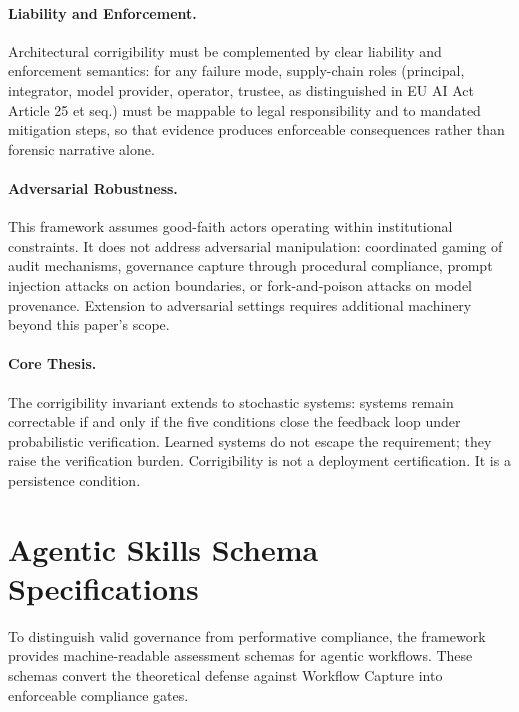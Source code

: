 \documentclass[11pt,a4paper]{article}
\theoremstyle{definition}
\begin{document}
\paragraph{Liability and Enforcement.} Architectural corrigibility must be complemented by clear liability and enforcement semantics: for any failure mode, supply-chain roles (principal, integrator, model provider, operator, trustee, as distinguished in EU AI Act Article 25 et seq.) must be mappable to legal responsibility and to mandated mitigation steps, so that evidence produces enforceable consequences rather than forensic narrative alone.

\paragraph{Adversarial Robustness.} This framework assumes good-faith actors operating within institutional constraints. It does not address adversarial manipulation: coordinated gaming of audit mechanisms, governance capture through procedural compliance, prompt injection attacks on action boundaries, or fork-and-poison attacks on model provenance. Extension to adversarial settings requires additional machinery beyond this paper's scope.

\paragraph{Core Thesis.} The corrigibility invariant extends to stochastic systems: systems remain correctable if and only if the five conditions close the feedback loop under probabilistic verification. Learned systems do not escape the requirement; they raise the verification burden. Corrigibility is not a deployment certification. It is a persistence condition.


\appendix

\section{Agentic Skills Schema Specifications}
\label{appendix:agentic-schema}

To distinguish valid governance from performative compliance, the framework provides machine-readable assessment schemas for agentic workflows. These schemas convert the theoretical defense against Workflow Capture into enforceable compliance gates.
\end{document}
